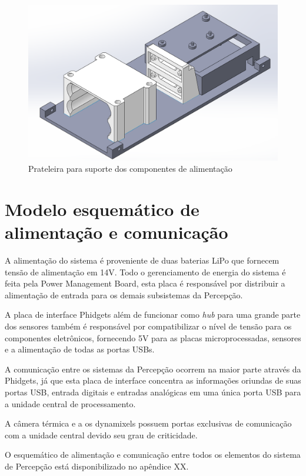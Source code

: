 \begin{figure}[h]
	\centering
	\includegraphics[width=14cm]{Figures/pecadebaixo.png}
	\caption{Prateleira para suporte dos componentes de alimentação} \label{pecaaliment}
\end{figure}

\section{Modelo esquemático de alimentação e comunicação}
\label{sec:modesq}

A alimentação do sistema é proveniente de duas baterias LiPo que fornecem tensão de alimentação em 14V. Todo o gerenciamento de energia do sistema é feita pela Power Management Board, esta placa é responsável por distribuir a alimentação de entrada para os demais subsistemas da Percepção. 

A placa de interface Phidgets além de funcionar como \textit{hub} para uma grande parte dos sensores também é responsável por compatibilizar o nível de tensão para os componentes eletrônicos, fornecendo 5V para as placas microprocessadas, sensores e a alimentação de todas as portas USBs. 

A comunicação entre os sistemas da Percepção ocorrem na maior parte  através da Phidgets, já que esta placa de interface concentra as informações oriundas de suas portas USB, entrada digitais e entradas analógicas em uma única porta USB para a unidade central de processamento.

 A câmera térmica e a os dynamixels possuem portas exclusivas de comunicação com a unidade central devido seu grau de criticidade.

O esquemático de alimentação e comunicação entre todos os elementos do sistema de Percepção está disponibilizado no apêndice XX.

